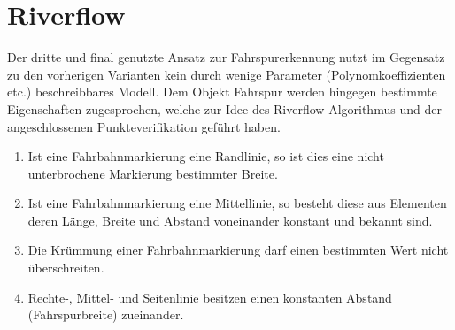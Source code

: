 \section{Riverflow \dcsecondauthorshort} 
\label{sec:fahrspurerkennung:riverflow}

Der dritte und final genutzte Ansatz zur Fahrspurerkennung nutzt im Gegensatz zu den vorherigen Varianten kein durch wenige Parameter (Polynomkoeffizienten etc.) beschreibbares Modell. Dem Objekt Fahrspur werden hingegen bestimmte Eigenschaften zugesprochen, welche zur Idee des Riverflow-Algorithmus \autocite{limRiverFlowLane2012} und der angeschlossenen Punkteverifikation geführt haben.
\begin{enumerate}
\item \label{item:riverflow:rule:solidline}
Ist eine Fahrbahnmarkierung eine Randlinie, so ist dies eine nicht unterbrochene Markierung bestimmter Breite.
\item \label{item:riverflow:rule:dashedline}
Ist eine Fahrbahnmarkierung eine Mittellinie, so besteht diese aus Elementen deren Länge, Breite und Abstand voneinander konstant und bekannt sind.
\item \label{item:riverflow:rule:curvature}
Die Krümmung einer Fahrbahnmarkierung darf einen bestimmten Wert nicht überschreiten.
\item \label{item:riverflow:rule:distance}
Rechte-, Mittel- und Seitenlinie besitzen einen konstanten Abstand (Fahrspurbreite) zueinander.
\end{enumerate}


%